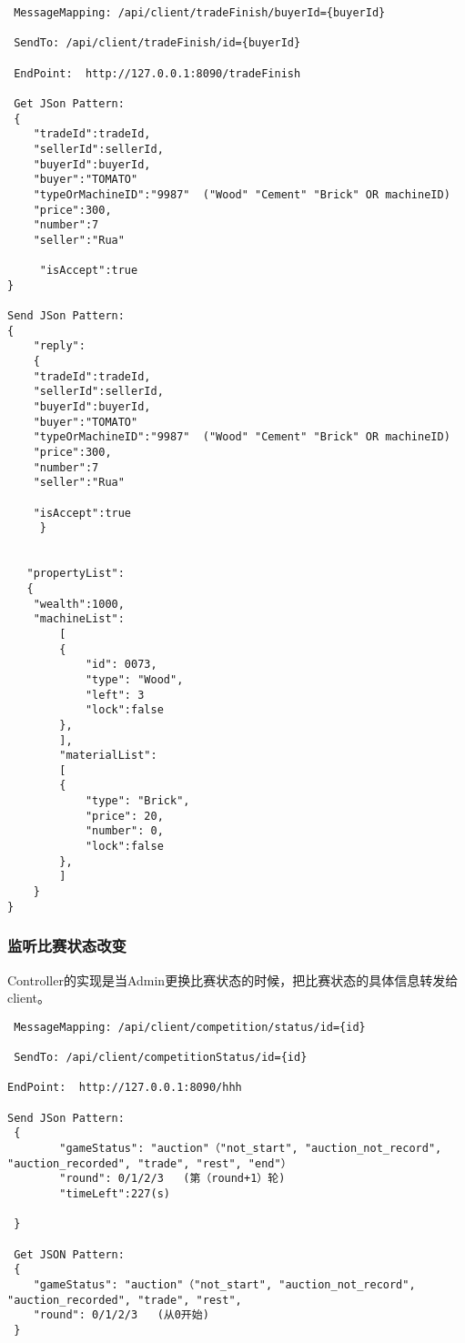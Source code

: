 \documentclass{article}
\begin{document}
\begin{lstlisting}
 MessageMapping: /api/client/tradeFinish/buyerId={buyerId}

 SendTo: /api/client/tradeFinish/id={buyerId}

 EndPoint:  http://127.0.0.1:8090/tradeFinish

 Get JSon Pattern:
 {
    "tradeId":tradeId,
    "sellerId":sellerId,
    "buyerId":buyerId,
    "buyer":"TOMATO"
    "typeOrMachineID":"9987"  ("Wood" "Cement" "Brick" OR machineID)
    "price":300,
    "number":7
    "seller":"Rua"

     "isAccept":true
}

Send JSon Pattern:
{
    "reply":
    {
    "tradeId":tradeId,
    "sellerId":sellerId,
    "buyerId":buyerId,
    "buyer":"TOMATO"
    "typeOrMachineID":"9987"  ("Wood" "Cement" "Brick" OR machineID)
    "price":300,
    "number":7
    "seller":"Rua"

    "isAccept":true
     }


   "propertyList":
   {
   	"wealth":1000,
   	"machineList":
    	[
        {
            "id": 0073,
            "type": "Wood",
            "left": 3
            "lock":false
        },
    	],
    	"materialList":
    	[
        {
            "type": "Brick",
            "price": 20,
            "number": 0,
            "lock":false
        },
    	]
    }
}
\end{lstlisting}

				\subsubsection{监听比赛状态改变}

                Controller的实现是当Admin更换比赛状态的时候，把比赛状态的具体信息转发给client。

\begin{lstlisting}
 MessageMapping: /api/client/competition/status/id={id}

 SendTo: /api/client/competitionStatus/id={id}

EndPoint:  http://127.0.0.1:8090/hhh

Send JSon Pattern:
 {
    	"gameStatus": "auction"（"not_start", "auction_not_record", "auction_recorded", "trade", "rest", "end"）
        "round": 0/1/2/3   (第（round+1）轮)
        "timeLeft":227(s)

 }

 Get JSON Pattern:
 {
    "gameStatus": "auction"（"not_start", "auction_not_record", "auction_recorded", "trade", "rest",
    "round": 0/1/2/3   (从0开始)
 }
\end{lstlisting}
\end{document}
